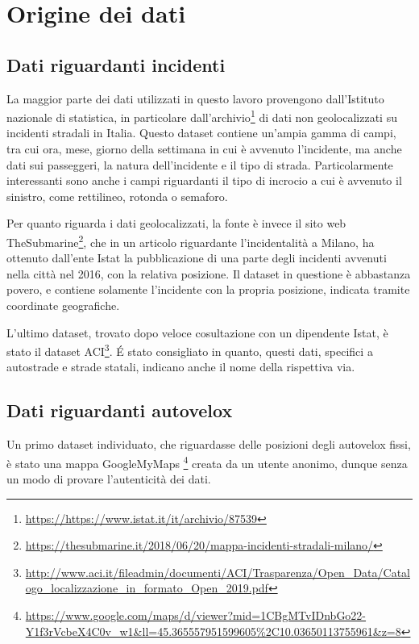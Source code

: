 \documentclass[a4paper]{report}
\begin{document}
\section{Origine dei dati}

\subsection{Dati riguardanti incidenti}
La maggior parte dei dati utilizzati in questo lavoro provengono 
dall'Istituto nazionale di statistica, 
in particolare dall'archivio\footnote{\url{https://https://www.istat.it/it/archivio/87539}} 
di dati non geolocalizzati su incidenti stradali in Italia.
Questo dataset contiene un'ampia gamma di campi, tra cui ora, 
mese, giorno della settimana in cui è avvenuto l'incidente, 
ma anche dati sui passeggeri, la natura dell'incidente e il tipo di strada. 
Particolarmente interessanti sono anche i campi riguardanti il tipo di incrocio a cui è 
avvenuto il sinistro, come rettilineo, rotonda o semaforo.

Per quanto riguarda i dati geolocalizzati, 
la fonte è invece il sito web TheSubmarine\footnote{\url{https://thesubmarine.it/2018/06/20/mappa-incidenti-stradali-milano/}},
che in un articolo riguardante l'incidentalità a Milano, 
ha ottenuto dall'ente Istat la pubblicazione di una parte degli 
incidenti avvenuti nella città nel 2016, con la relativa posizione.
Il dataset in questione è abbastanza povero, e contiene solamente l'incidente con la 
propria posizione, indicata tramite coordinate geografiche.

L'ultimo dataset, trovato dopo veloce cosultazione con un dipendente Istat, è stato 
il dataset ACI\footnote{\url{http://www.aci.it/fileadmin/documenti/ACI/Trasparenza/Open_Data/Catalogo_localizzazione_in_formato_Open_2019.pdf}}.
\'E stato consigliato in quanto, questi dati, specifici a autostrade e strade statali, 
indicano anche il nome della rispettiva via.

\subsection{Dati riguardanti autovelox}
Un primo dataset individuato, che riguardasse delle posizioni degli autovelox fissi, 
è stato una mappa GoogleMyMaps
\footnote{\url{https://www.google.com/maps/d/viewer?mid=1CBgMTvIDnbGo22-Y1f3rVcbeX4C0v_w1&ll=45.365557951599605\%2C10.03650113755961&z=8}} 
creata da un utente anonimo, dunque senza un modo di provare l'autenticità dei dati.
\end{document}
